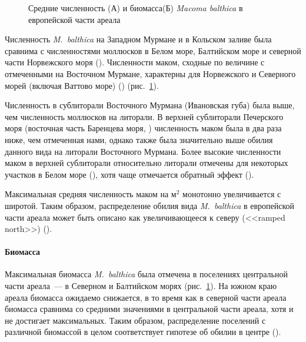{\begin{figure}[]
\begin{minipage}[b]{.5\linewidth}
\begin{center}
			\end{center}
		\end{minipage}
	\caption{Средние численность (А) и биомасса(Б) {\it Macoma balthica} в европейской части ареала}
	\label{ris:NB_areal}
	\end{figure}
Численность {\it M.~balthica} на Западном Мурмане и в Кольском заливе была сравнима с численностями моллюсков в Белом море, Балтийском море и северной части Норвежского моря (\cite{Semenova_1974, Aschan_1988, Maximovich_et_al_1991, Bonsdorff_et_al_1995, Bostrom_Bonsdorff_2000, Oug_2001, Laine_et_al_2003, Khaitov_et_al_2007, Varfolomeeva_Naumov_2013}).
Численности маком, сходные по величине с отмеченными на Восточном Мурмане, характерны для Норвежского и Северного морей (включая Ваттово море) (\cite{Brady_1943, Sneli_1968, Stromgren_et_al_1973, Beukema_1976, Jensen_Jensen_1985, Jensen_et_al_1985, Madsen_Jensen_1987, Beukema_1979, Zwarts_Wanink_1993, Reise_et_al_1994}) (рис.~\ref{ris:NB_areal}).

Численность в сублиторали Восточного Мурмана (Ивановская губа) была выше, чем численность моллюсков на литорали.
В верхней сублиторали Печерского моря (восточная часть Баренцева моря, \cite{Denisenko_et_al_2003}) численность маком была в два раза ниже, чем отмеченная нами, однако также была значительно выше обилия данного вида на литорали Восточного Мурмана.
Более высокие численности маком в верхней сублиторали относительно литорали отмечены для некоторых участков в Белом море (\cite{Semenova_1974}), хотя чаще отмечается обратный эффект (\cite{Semenova_1974, Maximovich_et_al_1991}).

Максимальная средняя численность маком на м$^2$ монотонно увеличивается с широтой.
Таким образом, распределение обилия вида {\it M.~balthica} в европейской части ареала может быть описано как увеличивающееся к северу (<<ramped north>>) (\cite{Sagarin_Gaines_2002}).

\paragraph{Биомасса}
Максимальная биомасса \textit{M.~balthica} была отмечена в поселениях центральной части ареала~--- в Северном и Балтийском морях (рис.~\ref{ris:NB_areal}).
На южном краю ареала биомасса ожидаемо снижается, в то время как в северной части ареала биомасса сравнима со средними значениями в центральной части ареала, хотя и не достигает максимальных.
Таким образом, распределение поселений с различной биомассой в целом соответствует гипотезе об обилии в центре (\cite{Sagarin_Gaines_2002}).

}
